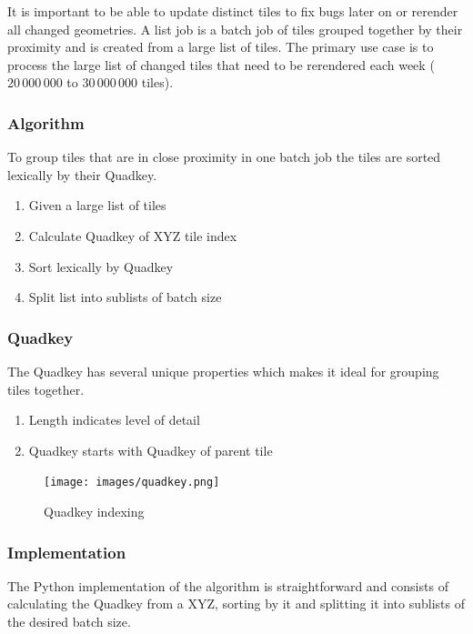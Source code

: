 It is important to be able to update distinct tiles to fix bugs later on or rerender all changed geometries. A list job is a batch job of tiles grouped together by their proximity and is created from a large list of tiles. The primary use case is to process the large list of changed tiles that need to be rerendered each week ($20\,000\,000$ to $30\,000\,000$ tiles).

\subsubsection*{Algorithm}

To group tiles that are in close proximity in one batch job the tiles are sorted lexically by their Quadkey.

\begin{enumerate}  
    \item Given a large list of tiles
    \item Calculate Quadkey of XYZ tile index
    \item Sort lexically by Quadkey
    \item Split list into sublists of batch size
\end{enumerate}

\subsubsection*{Quadkey}

The Quadkey has several unique properties which makes it ideal for grouping
tiles together.

\begin{enumerate}  
    \item Length indicates level of detail
    \item Quadkey starts with Quadkey of parent tile
\end{enumerate}

\begin{figure}[H]
  \centering
  \texttt{[image: images/quadkey.png]}
  \caption{Quadkey indexing}
\end{figure}

\subsubsection*{Implementation}

The Python implementation of the algorithm is straightforward and consists of
calculating the Quadkey from a XYZ, sorting by it and splitting it into
sublists of the desired batch size.

